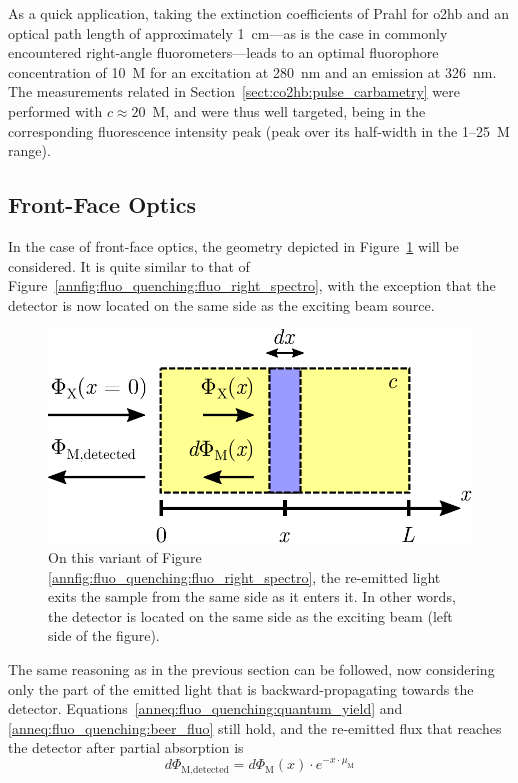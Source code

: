 As a quick application, taking the extinction coefficients of Prahl\cite{prahl1998} for \gls{o2hb} and an optical path length of approximately 1~cm---as is the case in commonly encountered right-angle fluorometers---leads to an optimal fluorophore concentration of 10~{\textmu}M for an excitation at 280~nm and an emission at 326~nm. The measurements related in Section~\ref{sect:co2hb:pulse_carbametry} were performed with $c\approx20$~{\textmu}M, and were thus well targeted, being in the corresponding fluorescence intensity peak (peak over its half-width in the 1--25~{\textmu}M range).

\subsection{Front-Face Optics}

In the case of front-face optics, the geometry depicted in Figure~\ref{annfig:fluo_quenching:fluo_front_spectro} will be considered. It is quite similar to that of Figure~\ref{annfig:fluo_quenching:fluo_right_spectro}, with the exception that the detector is now located on the same side as the exciting beam source.

\begin{figure}
	\centering
	\includegraphics[scale=0.7]{2_appendices/figures/front_face_scheme.pdf}
	\caption[Front-face optics scheme.]{On this variant of Figure \ref{annfig:fluo_quenching:fluo_right_spectro}, the re-emitted light exits the sample from the same side as it enters it. In other words, the detector is located on the same side as the exciting beam (left side of the figure).}
	\label{annfig:fluo_quenching:fluo_front_spectro}
\end{figure}

The same reasoning as in the previous section can be followed, now considering only the part of the emitted light that is backward-propagating towards the detector. Equations~\ref{anneq:fluo_quenching:quantum_yield} and \ref{anneq:fluo_quenching:beer_fluo} still hold, and the re-emitted flux that reaches the detector after partial absorption is
\begin{equation}
	d\Phi_\text{M,detected} = d\Phi_\text{M}(x) \cdot e^{-x \cdot \mu_\text{M}}
\end{equation}

